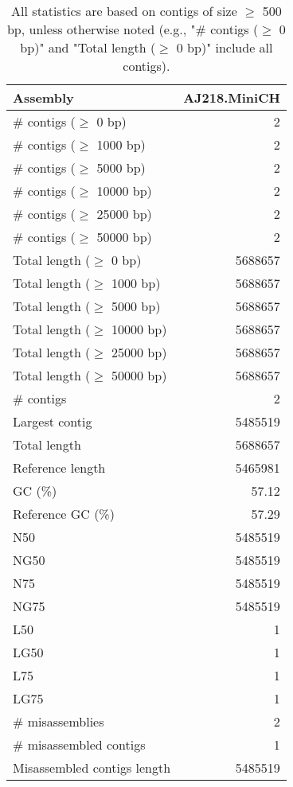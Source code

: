 \documentclass[12pt,a4paper]{article}
\begin{document}
\begin{table}[ht]
\begin{center}
\caption{All statistics are based on contigs of size $\geq$ 500 bp, unless otherwise noted (e.g., "\# contigs ($\geq$ 0 bp)" and "Total length ($\geq$ 0 bp)" include all contigs).}
\begin{tabular}{|l*{1}{|r}|}
\hline
Assembly & AJ218.MiniCH \\ \hline
\# contigs ($\geq$ 0 bp) & 2 \\ \hline
\# contigs ($\geq$ 1000 bp) & 2 \\ \hline
\# contigs ($\geq$ 5000 bp) & 2 \\ \hline
\# contigs ($\geq$ 10000 bp) & 2 \\ \hline
\# contigs ($\geq$ 25000 bp) & 2 \\ \hline
\# contigs ($\geq$ 50000 bp) & 2 \\ \hline
Total length ($\geq$ 0 bp) & 5688657 \\ \hline
Total length ($\geq$ 1000 bp) & 5688657 \\ \hline
Total length ($\geq$ 5000 bp) & 5688657 \\ \hline
Total length ($\geq$ 10000 bp) & 5688657 \\ \hline
Total length ($\geq$ 25000 bp) & 5688657 \\ \hline
Total length ($\geq$ 50000 bp) & 5688657 \\ \hline
\# contigs & 2 \\ \hline
Largest contig & 5485519 \\ \hline
Total length & 5688657 \\ \hline
Reference length & 5465981 \\ \hline
GC (\%) & 57.12 \\ \hline
Reference GC (\%) & 57.29 \\ \hline
N50 & 5485519 \\ \hline
NG50 & 5485519 \\ \hline
N75 & 5485519 \\ \hline
NG75 & 5485519 \\ \hline
L50 & 1 \\ \hline
LG50 & 1 \\ \hline
L75 & 1 \\ \hline
LG75 & 1 \\ \hline
\# misassemblies & 2 \\ \hline
\# misassembled contigs & 1 \\ \hline
Misassembled contigs length & 5485519 \\ \hline

\end{tabular}
\end{center}
\end{table}
\end{document}
